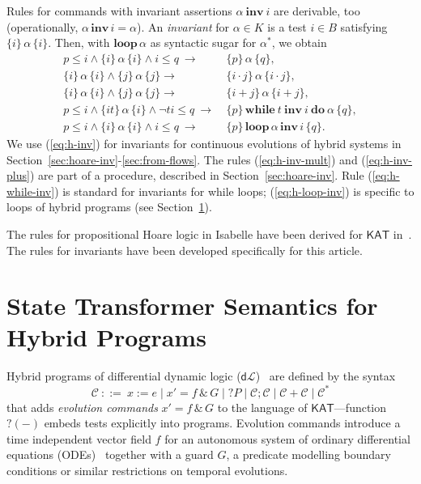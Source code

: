 \documentclass[envcountsame,envcountsect]{llncs}
\newcommand{\WHILEI}[3]{\mathbf{while}\ #1\ \mathbf{inv}\ #2\ \mathbf{do}\ #3}
\newcommand{\KAT}{\mathsf{KAT}}
\newcommand{\dL}{\mathsf{d}\mathcal{L}}
\begin{document}
Rules for commands with invariant assertions $\alpha\ \mathbf{inv}\ i$
are derivable, too (operationally,
$\alpha\, \mathbf{inv}\, i = \alpha$).  An \emph{invariant} for
$\alpha\in K$ is a test $i\in B$ satisfying $\{i\}\, \alpha\, \{i\}$.
Then, with $\mathbf{loop}\, \alpha$ as syntactic sugar for
$\alpha^\ast$, we obtain
\begin{align}
  p\le i \land \{i\}\, \alpha\, \{i\}\land i\le q\ \rightarrow\
  &\{p\}\, \alpha\, \{q\},\label{eq:h-inv}\tag{h-inv}\\
  \{i\}\, \alpha\, \{i\} \land \{j\}\, \alpha\, \{j\}\rightarrow\
  &\{i\cdot j\}\, \alpha\, \{i\cdot j\},\label{eq:h-inv-mult}\tag{h-inv-mult}\\
  \{i\}\, \alpha\, \{i\} \land \{j\}\, \alpha\, \{j\}\rightarrow\
  &\{i+ j\}\, \alpha\, \{i+ j\},\label{eq:h-inv-plus}\tag{h-inv-plus}\\
  p \le i \wedge \{it\}\, \alpha\, \{i\} \wedge \neg t i\le q\
  \rightarrow \ & \{p\}\, \WHILEI{t}{i}{\alpha}\,  \{q\},\label{eq:h-while-inv}\tag{h-while-inv}\\
   p\le i \land \{i\}\, \alpha\, \{i\}\land i\le q\ \rightarrow\ &
                                                                   \{p\}\, \mathbf{loop}\, \alpha\,
    \mathbf{inv}\, i\, \{q\}. \label{eq:h-loop-inv}\tag{h-loop-inv}
\end{align}
We use (\ref{eq:h-inv}) for invariants for continuous
evolutions of hybrid systems in Section~\ref{sec:hoare-inv}-\ref{sec:from-flows}. The rules (\ref{eq:h-inv-mult}) and (\ref{eq:h-inv-plus}) are part of a procedure, described in Section~\ref{sec:hoare-inv}. Rule (\ref{eq:h-while-inv})
is standard for  invariants for while loops;
(\ref{eq:h-loop-inv}) is specific to loops of hybrid programs (see
Section~\ref{sec:sta-hybrid}).

The rules for propositional Hoare logic in Isabelle have been derived
for $\KAT$ in~\cite{afp:kat,afp:vericomp}. The rules for invariants
have been developed specifically for this article.



\section{State Transformer Semantics for Hybrid
  Programs}\label{sec:sta-hybrid}


Hybrid programs of differential dynamic logic ($\dL$)~\cite{Platzer18}
are defined by the syntax
\begin{equation*}
\mathcal{C}\ ::= \ x:=e \mid x' = f \, \&\, G \mid ?P\mid \mathcal{C};\mathcal{C}\mid \mathcal{C}+\mathcal{C}\mid \mathcal{C}^*
\end{equation*}
that adds \emph{evolution commands} $x' = f \, \&\, G$ to the language
of $\KAT$---function $?(-)$ embeds tests explicitly into programs.
Evolution commands introduce a time independent vector field $f$ for
an autonomous system of ordinary differential equations
(ODEs)~\cite{Teschl12} together with a guard $G$, a predicate
modelling boundary conditions or similar restrictions on temporal
evolutions. %
\end{document}
